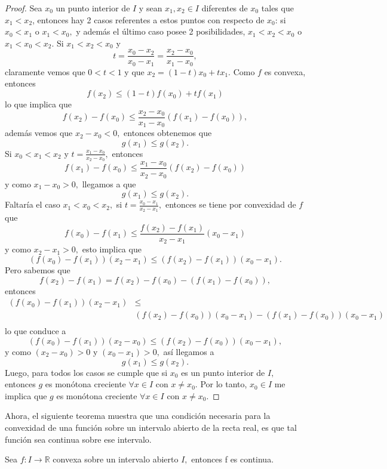 \begin{proof}
	Sea $x_0$ un punto interior de $I$ y sean $x_1, x_2 \in I$ diferentes de $x_0$ tales que $x_1 < x_2$, entonces hay 2 casos referentes a estos puntos con respecto de $x_0$: si $x_0 < x_1$ o $x_1 < x_0,$ y además el último caso posee 2 posibilidades, $x_1 < x_2 < x_0$ o $x_1 < x_0 < x_2.$
	Si $x_1 < x_2 < x_0$ y $$t = \frac{x_0-x_2}{x_0-x_1} = \frac{x_2-x_0}{x_1-x_0},$$ claramente vemos que $0 < t < 1$ y que $x_2 = (1-t)x_0+tx_1.$
	Como $f$ es convexa, entonces $$f(x_2) \leq (1-t)f(x_0)+tf(x_1)$$ lo que implica que $$f(x_2)-f(x_0) \leq \frac{x_2-x_0}{x_1-x_0}(f(x_1)-f(x_0)),$$ además vemos que $x_2-x_0 < 0,$ entonces obtenemos que $$g(x_1) \leq g(x_2).$$
	Si $x_0 < x_1 < x_2$ y $t = \tfrac{x_1-x_0}{x_2-x_0},$ entonces $$f(x_1)-f(x_0) \leq \frac{x_1-x_0}{x_2-x_0}(f(x_2)-f(x_0))$$ y como $x_1-x_0 > 0,$ llegamos a que $$g(x_1) \leq g(x_2).$$
	Faltaría el caso $x_1 < x_0 < x_2,$ si $t = \frac{x_0-x_1}{x_2-x_1},$ entonces se tiene por convexidad de $f$ que $$f(x_0)-f(x_1) \leq \frac{f(x_2)-f(x_1)}{x_2-x_1}(x_0-x_1)$$ y como $x_2-x_1 > 0,$ esto implica que $$(f(x_0)-f(x_1))(x_2-x_1) \leq (f(x_2)-f(x_1))(x_0-x_1).$$ Pero sabemos que $$f(x_2)-f(x_1) = f(x_2)-f(x_0)-(f(x_1)-f(x_0)),$$ entonces
	\begin{align*}
	(f(x_0)-f(x_1))(x_2-x_1) &\leq \\ 
	&(f(x_2)-f(x_0))(x_0-x_1)-(f(x_1)-f(x_0))(x_0-x_1)\\
	\end{align*}
	lo que conduce a $$(f(x_0)-f(x_1))(x_2-x_0) \leq (f(x_2)-f(x_0))(x_0-x_1),$$
	y como $(x_2-x_0) > 0$ y $(x_0-x_1) > 0,$ así llegamos a $$g(x_1) \leq g(x_2).$$
	Luego, para todos los casos se cumple que si $x_0$ es un punto interior de $I,$ entonces $g$ es monótona creciente $\forall x \in I$ con $x \neq x_0.$ Por lo tanto, $x_0 \in I$ me implica que $g$ es monótona creciente $\forall x \in I$ con $x \neq x_0.$
\end{proof}
Ahora, el siguiente teorema muestra que una condición necesaria para la convexidad de una función sobre un intervalo abierto de la recta real, es que tal función sea continua sobre ese intervalo.
\begin{theorem}
	Sea $f: I \rightarrow \mathbb{R}$ convexa sobre un intervalo abierto $I,$ entonces f es continua.
\end{theorem}
